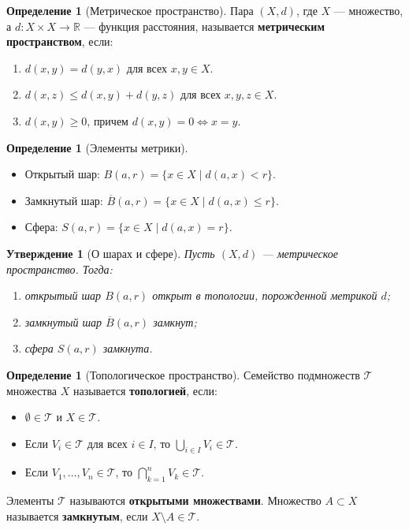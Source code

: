 \documentclass[12pt,a4paper]{article}
\newtheorem{proposition}[theorem]{Утверждение}
\theoremstyle{definition}
\newtheorem{definition}[theorem]{Определение}
\begin{document}
\begin{definition}[Метрическое пространство]
Пара $(X, d)$, где $X$ --- множество, а $d: X \times X \to \mathbb{R}$ --- функция расстояния, называется \textbf{метрическим пространством}, если:
\begin{enumerate}
    \item $d(x, y) = d(y, x)$ для всех $x,y \in X$.
    \item $d(x, z) \leqslant d(x, y) + d(y, z)$ для всех $x,y,z \in X$.
    \item $d(x, y) \geqslant 0$, причем $d(x, y) = 0 \iff x = y$.
\end{enumerate}
\end{definition}

\begin{definition}[Элементы метрики]
\begin{itemize}
    \item Открытый шар: $B(a, r) = \{x \in X \mid d(a, x) < r\}$.
    \item Замкнутый шар: $\overline{B}(a, r) = \{x \in X \mid d(a, x) \leqslant r\}$.
    \item Сфера: $S(a, r) = \{x \in X \mid d(a, x) = r\}$.
\end{itemize}
\end{definition}

\begin{proposition}[О шарах и сфере]
Пусть $(X, d)$ --- метрическое пространство. Тогда:
\begin{enumerate}
    \item открытый шар $B(a, r)$ открыт в топологии, порожденной метрикой $d$;
    \item замкнутый шар $\overline{B}(a, r)$ замкнут;
    \item сфера $S(a, r)$ замкнута.
\end{enumerate}
\end{proposition}

\begin{definition}[Топологическое пространство]
Семейство подмножеств $\mathcal{T}$ множества $X$ называется \textbf{топологией}, если:
\begin{itemize}
    \item $\emptyset \in \mathcal{T}$ и $X \in \mathcal{T}$.
    \item Если $V_i \in \mathcal{T}$ для всех $i \in I$, то $\bigcup_{i \in I} V_i \in \mathcal{T}$.
    \item Если $V_1, \dots, V_n \in \mathcal{T}$, то $\bigcap_{k=1}^n V_k \in \mathcal{T}$.
\end{itemize}
Элементы $\mathcal{T}$ называются \textbf{открытыми множествами}. Множество $A \subset X$ называется \textbf{замкнутым}, если $X \setminus A \in \mathcal{T}$.
\end{definition}
\end{document}
